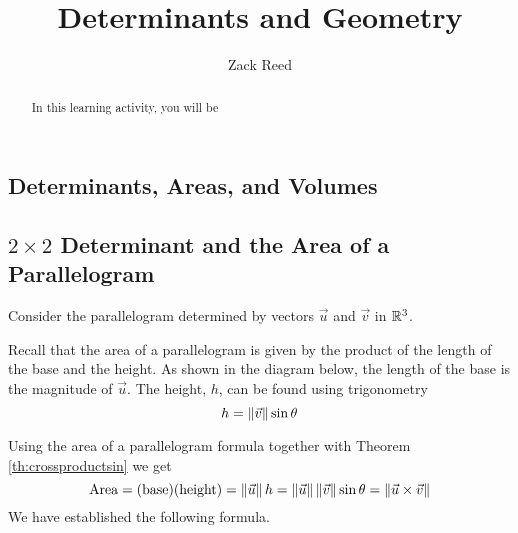 \documentclass{ximera}
\author{Zack Reed}
\title{Determinants and Geometry}
\begin{document}
\begin{abstract}

    In this learning activity, you will be 
\end{abstract}
\maketitle

\begin{onlineOnly}
    \section*{Determinants, Areas, and Volumes}
    \end{onlineOnly}
     
    \subsection*{$2\times 2$ Determinant and the Area of a Parallelogram}
     
    Consider the parallelogram determined by vectors $\vec{u}$ and $\vec{v}$ in $\mathbb{R}^3$.
     
    \begin{center}
    \end{center}
     
    Recall that the area of a parallelogram is given by the product of the length of the base and the height.
    As shown in the diagram below, the length of the base is the magnitude of $\vec{u}$. The height, $h$, can be found using trigonometry $$h=\left\|\vec{v}\right\|\sin\theta$$
    \begin{center}
    \end{center}
    Using the area of a parallelogram formula together with Theorem \ref{th:crossproductsin} we get
    $$\mbox{Area}=(\text{base})(\text{height})=\left\|\vec{u}\right\|h=\left\|\vec{u}\right\|\left\|\vec{v}\right\|\sin\theta=\left\|\vec{u}\times\vec{v}\right\|$$
    We have established the following formula.
     
\end{document}

